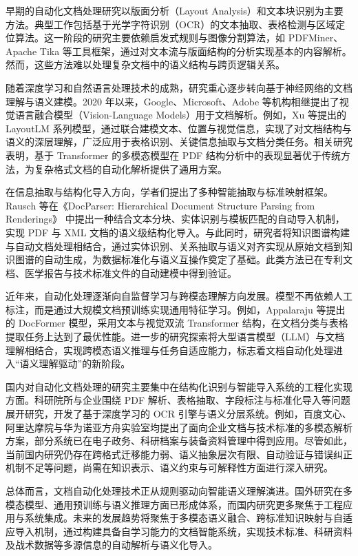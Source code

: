 早期的自动化文档处理研究以版面分析（Layout Analysis）和文本块识别为主要方法。典型工作包括基于光学字符识别（OCR）的文本抽取、表格检测与区域定位算法。这一阶段的研究主要依赖启发式规则与图像分割算法，如 PDFMiner、Apache Tika 等工具框架，通过对文本流与版面结构的分析实现基本的内容解析。然而，这些方法难以处理复杂文档中的语义结构与跨页逻辑关系。

随着深度学习和自然语言处理技术的成熟，研究重心逐步转向基于神经网络的文档理解与语义建模。2020 年以来，Google、Microsoft、Adobe 等机构相继提出了视觉语言融合模型（Vision-Language Models）用于文档解析。例如，Xu 等提出的 LayoutLM 系列模型\cite{Xu2020LayoutLM,Huang2022LayoutLMv3}，通过联合建模文本、位置与视觉信息，实现了对文档结构与语义的深层理解，广泛应用于表格识别、关键信息抽取与文档分类任务。相关研究表明，基于 Transformer 的多模态模型在 PDF 结构分析中的表现显著优于传统方法，为复杂格式文档的自动化解析提供了通用方案。

在信息抽取与结构化导入方向，学者们提出了多种智能抽取与标准映射框架。Rausch 等在《DocParser: Hierarchical Document Structure Parsing from Renderings》\cite{Rausch2021DocParser} 中提出一种结合文本分块、实体识别与模板匹配的自动导入机制，实现 PDF 与 XML 文档的语义级结构化导入。与此同时，研究者将知识图谱构建与自动文档处理相结合，通过实体识别、关系抽取与语义对齐实现从原始文档到知识图谱的自动生成，为数据标准化与语义互操作奠定了基础。此类方法已在专利文档、医学报告与技术标准文件的自动建模中得到验证。

近年来，自动化处理逐渐向自监督学习与跨模态理解方向发展。模型不再依赖人工标注，而是通过大规模文档预训练实现通用特征学习。例如，Appalaraju 等提出的 DocFormer 模型\cite{Appalaraju2021DocFormer}，采用文本与视觉双流 Transformer 结构，在文档分类与表格提取任务上达到了最优性能。进一步的研究探索将大型语言模型（LLM）与文档理解相结合，实现跨模态语义推理与任务自适应能力\cite{Wang2023DocumentLLM}，标志着文档自动化处理进入“语义理解驱动”的新阶段。

国内对自动化文档处理的研究主要集中在结构化识别与智能导入系统的工程化实现方面。科研院所与企业围绕 PDF 解析、表格抽取、字段标注与标准化导入等问题展开研究，开发了基于深度学习的 OCR 引擎与语义分层系统。例如，百度文心、阿里达摩院与华为诺亚方舟实验室均提出了面向企业文档与技术标准的多模态解析方案，部分系统已在电子政务、科研档案与装备资料管理中得到应用。尽管如此，当前国内研究仍存在跨格式迁移能力弱、语义抽象层次有限、自动验证与错误纠正机制不足等问题，尚需在知识表示、语义约束与可解释性方面进行深入研究。

总体而言，文档自动化处理技术正从规则驱动向智能语义理解演进。国外研究在多模态模型、通用预训练与语义推理方面已形成体系，而国内研究更多聚焦于工程应用与系统集成。未来的发展趋势将聚焦于多模态语义融合、跨标准知识映射与自适应导入机制，通过构建具备自学习能力的文档智能系统，实现技术标准、科研资料及战术数据等多源信息的自动解析与语义化导入。




